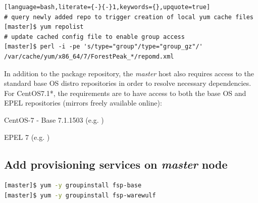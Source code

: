\documentclass[letterpaper]{article}
\newcommand{\baseOS}{CentOS7.1*}
\begin{document}
\begin{lstlisting}[language=bash,literate={-}{-}1,keywords={},upquote=true]
# query newly added repo to trigger creation of local yum cache files
[master]$ yum repolist          
# update cached config file to enable group access
[master]$ perl -i -pe 's/type="group"/type="group_gz"/' /var/cache/yum/x86_64/7/ForestPeak_*/repomd.xml
\end{lstlisting}

In addition to the \FSP{} package repository, the {\em master} host also
requires access to the standard base OS distro repositories in order to resolve
necessary dependencies. For \baseOS{}, the requirements are to have access to
both the base OS and EPEL repositories (mirrors freely available online):

\begin{itemize*}
\item CentOS-7 - Base 7.1.1503
  (e.g. \href{http://mirror.centos.org/centos/7.1.1503/os/x86\_64}
             {\color{blue}{http://mirror.centos.org/centos/7.1.1503/os/x86\_64}} )
\item EPEL 7 (e.g. \href{http://download.fedoraproject.org/pub/epel/7/x86\_64}
                        {\color{blue}{http://download.fedoraproject.org/pub/epel/7/x86\_64}} )
\end{itemize*}


\subsection{Add provisioning services on {\em master} node}


\begin{lstlisting}[language=bash,keywords={}]
[master]$ yum -y groupinstall fsp-base      
[master]$ yum -y groupinstall fsp-warewulf
\end{lstlisting}

\end{document}
